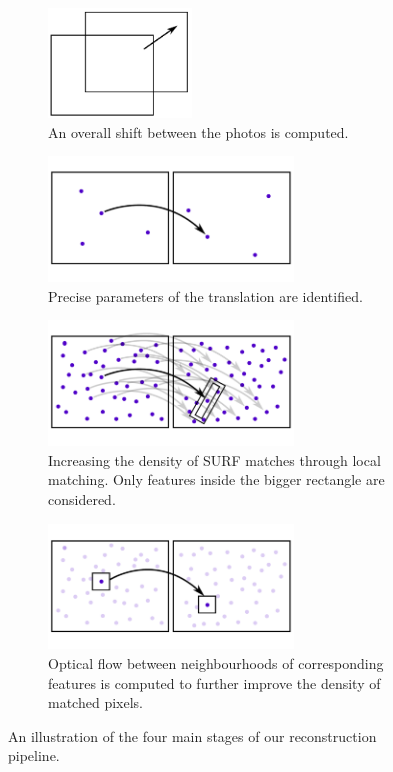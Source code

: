 \begin{figure}[H]
\centering

\begin{subfigure}[b]{0.45\textwidth}
\centering
\includegraphics[width=3.8cm]{img/impl0.pdf}
\caption{An overall shift between the photos is computed.} \label{impl0}
\end{subfigure}
\begin{subfigure}[b]{0.45\textwidth}
\centering
\includegraphics[width=6.5cm]{img/impl1.pdf}
\caption{Precise parameters of the translation are identified.} \label{impl1}
\end{subfigure}
\begin{subfigure}[b]{0.45\textwidth}
\centering
\includegraphics[width=6.5cm]{img/impl2.pdf}
\caption{Increasing the density of SURF matches through local matching. Only features inside the bigger rectangle are considered.} \label{impl2}
\end{subfigure}
\begin{subfigure}[b]{0.45\textwidth}
\centering
\includegraphics[width=6.5cm]{img/impl3.pdf}
\caption{Optical flow between neighbourhoods of corresponding features is computed to further improve the density of matched pixels.} \label{impl3}
\end{subfigure}

\caption[]{An illustration of the four main stages of our reconstruction pipeline.} 
\label{fig:impl}
\end{figure}


